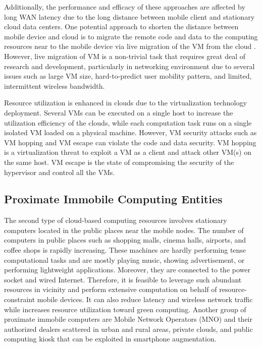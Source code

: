\documentclass[publish]{IEEEtran}
\begin{document}
Additionally, the performance and efficacy of these approaches are affected by long WAN latency due to the long distance between mobile client and stationary cloud data centers. One potential approach to shorten the distance between mobile device and cloud is to migrate the remote code and data to the computing resources near to the mobile device via live migration of the VM from the cloud \cite{LiveVM2005}. However, live migration of VM is a non-trivial task that requires great deal of research and development, particularly in networking environment due to several issues such as large VM size, hard-to-predict user mobility pattern, and limited, intermittent wireless bandwidth. 


Resource utilization is enhanced in clouds due to the virtualization technology deployment. Several VMs can be executed on a single host to increase the utilization efficiency of the clouds, while each computation task runs on a single isolated VM loaded on a physical machine. However, VM security attacks such as VM hopping and VM escape \cite{Owens} can violate the code and data security. VM hopping is a virtualization threat to exploit a VM as a client and attack other VM(s) on the same host. VM escape is the state of compromising the security of the hypervisor and control all the VMs. 


\subsection{Proximate Immobile Computing Entities}
The second type of cloud-based computing resources involves stationary computers located in the public places near the mobile nodes. The number of computers in public places such as shopping malls, cinema halls, airports, and coffee shops is rapidly increasing. These machines are hardly performing tense computational tasks and are mostly playing music, showing advertisement, or performing lightweight applications. Moreover, they are connected to the power socket and wired Internet. Therefore, it is feasible to leverage such abundant resources in vicinity and perform extensive computation on behalf of resource-constraint mobile devices. It can also reduce latency and wireless network traffic while increases resource utilization toward green computing. Another group of proximate immobile computers are Mobile Network Operators (MNO) and their authorized dealers scattered in urban and rural areas, private clouds, and public computing kiosk \cite{Garriss2008} that can be exploited in smartphone augmentation. 
\end{document}
